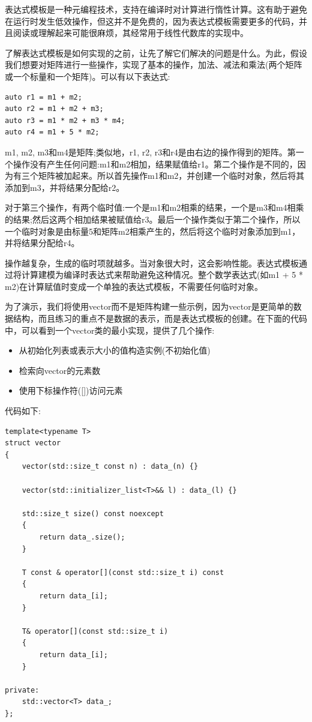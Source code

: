 
表达式模板是一种元编程技术，支持在编译时对计算进行惰性计算。这有助于避免在运行时发生低效操作，但这并不是免费的，因为表达式模板需要更多的代码，并且阅读或理解起来可能很麻烦，其经常用于线性代数库的实现中。

了解表达式模板是如何实现的之前，让先了解它们解决的问题是什么。为此，假设我们想要对矩阵进行一些操作，实现了基本的操作，加法、减法和乘法(两个矩阵或一个标量和一个矩阵)。可以有以下表达式:

\begin{lstlisting}[style=styleCXX]
auto r1 = m1 + m2;
auto r2 = m1 + m2 + m3;
auto r3 = m1 * m2 + m3 * m4;
auto r4 = m1 + 5 * m2;
\end{lstlisting}

m1, m2, m3和m4是矩阵;类似地，r1, r2, r3和r4是由右边的操作得到的矩阵。第一个操作没有产生任何问题:m1和m2相加，结果赋值给r1。第二个操作是不同的，因为有三个矩阵被加起来。所以首先操作m1和m2，并创建一个临时对象，然后将其添加到m3，并将结果分配给r2。

对于第三个操作，有两个临时值:一个是m1和m2相乘的结果，一个是m3和m4相乘的结果;然后这两个相加结果被赋值给r3。最后一个操作类似于第二个操作，所以一个临时对象是由标量5和矩阵m2相乘产生的，然后将这个临时对象添加到m1，并将结果分配给r4。

操作越复杂，生成的临时项就越多。当对象很大时，这会影响性能。表达式模板通过将计算建模为编译时表达式来帮助避免这种情况。整个数学表达式(如m1 + 5 * m2)在计算赋值时变成一个单独的表达式模板，不需要任何临时对象。

为了演示，我们将使用vector而不是矩阵构建一些示例，因为vector是更简单的数据结构，而且练习的重点不是数据的表示，而是表达式模板的创建。在下面的代码中，可以看到一个vector类的最小实现，提供了几个操作:

\begin{itemize}
\item
从初始化列表或表示大小的值构造实例(不初始化值)

\item
检索向vector的元素数

\item
使用下标操作符([])访问元素
\end{itemize}

代码如下:

\begin{lstlisting}[style=styleCXX]
template<typename T>
struct vector
{
	vector(std::size_t const n) : data_(n) {}
	
	vector(std::initializer_list<T>&& l) : data_(l) {}
	
	std::size_t size() const noexcept
	{
		return data_.size();
	}

	T const & operator[](const std::size_t i) const
	{
		return data_[i];
	}

	T& operator[](const std::size_t i)
	{
		return data_[i];
	}

private:
	std::vector<T> data_;
};
\end{lstlisting}

